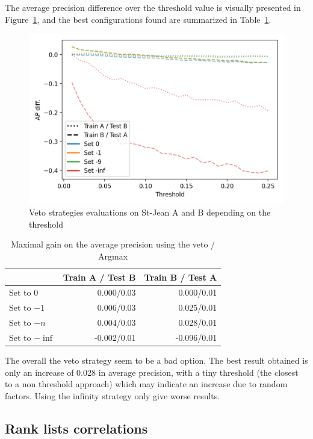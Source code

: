 The average precision difference over the threshold value is visually presented in Figure~\ref{fig:veto}, and the best configurations found are summarized in Table~\ref{tab:veto}.

\begin{figure}
  \caption{Veto strategies evaluations on St-Jean A and B depending on the threshold}
  \label{fig:veto}
  \includegraphics[width=\linewidth]{img/veto.png}
\end{figure}

\begin{table}
  \centering
  \caption{Maximal gain on the average precision using the veto / Argmax}
  \label{tab:veto}
  \begin{tabular}{l r r}
    \toprule
                   & Train A / Test B & Train B / Test A \\
    \midrule
    Set to $0$     & 0.000/0.03       & 0.000/0.01       \\
    Set to $-1$    & 0.006/0.03       & 0.025/0.01       \\
    Set to $-n$    & 0.004/0.03       & 0.028/0.01       \\
    Set to $-\inf$ & -0.002/0.01      & -0.096/0.01      \\
    \bottomrule
  \end{tabular}
\end{table}

The overall the veto strategy seem to be a bad option.
The best result obtained is only an increase of 0.028 in average precision, with a tiny threshold (the closest to a non threshold approach) which may indicate an increase due to random factors.
Using the infinity strategy only give worse results.

\subsection{Rank lists correlations}
